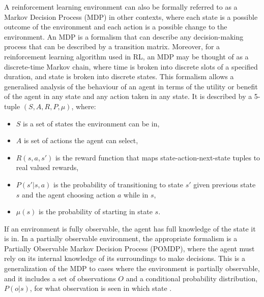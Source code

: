 A reinforcement learning environment can also be formally referred to as a Markov Decision Process (MDP) in other contexts, where each state is a possible outcome of the environment and each action is a possible change to the environment. 
An MDP is a formalism that can describe any decision-making process that can be described by a transition matrix. 
Moreover, for a reinforcement learning algorithm used in RL, an MDP may be thought of as a discrete-time Markov chain, where time is broken into discrete slots of a specified duration, and state is broken into discrete states.
This formalism allows a generalised analysis of the behaviour of an agent in terms of the utility or benefit of the agent in any state and any action taken in any state. It is described by a 5-tuple $(S,A,R,P,\mu)$, where:
\begin{itemize}
    \item $S$ is a set of states the environment can be in,
    \item $A$ is set of actions the agent can select,
    \item $R(s,a,s')$ is the reward function that maps state-action-next-state tuples to real valued rewards,
    \item $P(s'|s,a)$ is the probability of transitioning to state $s'$ given previous state $s$ and the agent choosing action $a$ while in $s$,
    \item $\mu(s)$ is the probability of starting in state $s$.
\end{itemize}
If an environment is fully observable, the agent has full knowledge of the state it is in. In a partially observable environment, the appropriate formalism is a Partially Observable Markov Decision Process (POMDP), where the agent must rely on its internal knowledge of its surroundings to make decisions. This is a generalization of the MDP to cases where the environment is partially observable, and it includes a set of observations $O$ and a conditional probability distribution, $P(o|s)$, for what observation is seen in which state \cite{sutton2018reinforcement}.



